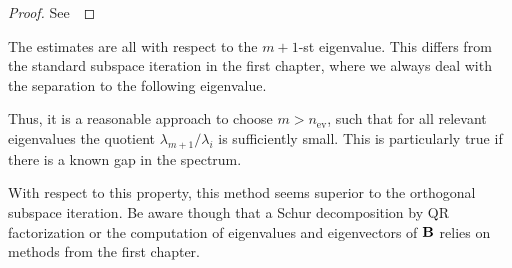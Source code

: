 \begin{proof}
  See~\cite[Theorem 5.2]{Saad11}
\end{proof}

\begin{remark}
  The estimates are all with respect to the $m+1$-st eigenvalue. This
  differs from the standard subspace iteration in the first chapter,
  where we always deal with the separation to the following
  eigenvalue.
  
  Thus, it is a reasonable approach to choose $m > n_{\text{ev}}$,
  such that for all relevant eigenvalues the quotient
  $\lambda_{m+1}/\lambda_i$ is sufficiently small. This is
  particularly true if there is a known gap in the spectrum.

  With respect to this property, this method seems superior to the
  orthogonal subspace iteration. Be aware though that a Schur
  decomposition by QR factorization or the computation of eigenvalues
  and eigenvectors of $\mathbf B$ relies on methods from the first
  chapter.
\end{remark}



